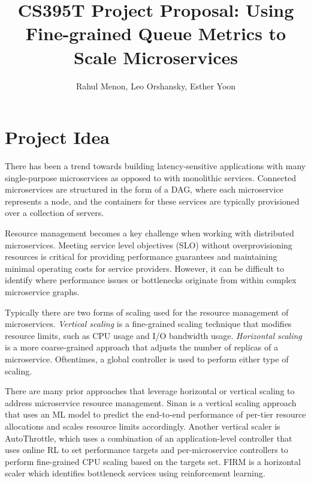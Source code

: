 \documentclass{proposal}
\begin{document}

\title{CS395T Project Proposal: Using Fine-grained Queue Metrics to Scale Microservices
}

\author{Rahul Menon, Leo Orshansky, Esther Yoon}

\maketitle


\section{Project Idea}
There has been a trend towards building latency-sensitive applications with many single-purpose microservices as opposed to with monolithic services. Connected microservices are structured in the form of a DAG, where each microservice represents a node, and the containers for these services are typically provisioned over a collection of servers.

Resource management becomes a key challenge when working with distributed microservices. Meeting service level objectives (SLO) without overprovisioning resources is critical for providing performance guarantees and maintaining minimal operating costs for service providers. However, it can be difficult to identify where performance issues or bottlenecks originate from within complex microservice graphs.

Typically there are two forms of scaling used for the resource management of microservices. \textit{Vertical scaling} is a fine-grained scaling technique that modifies resource limits, such as CPU usage and I/O bandwidth usage. \textit{Horizontal scaling} is a more coarse-grained approach that adjusts the number of replicas of a microservice. Oftentimes, a global controller is used to perform either type of scaling.

There are many prior approaches that leverage horizontal or vertical scaling to address microservice resource management. Sinan is a vertical scaling approach that uses an ML model to predict the end-to-end performance of per-tier resource allocations and scales resource limits accordingly. Another vertical scaler is AutoThrottle, which uses a combination of an application-level controller that uses online RL to set performance targets and per-microservice controllers to perform fine-grained CPU scaling based on the targets set. FIRM is a horizontal scaler which identifies bottleneck services using reinforcement learning. 
\end{document}
